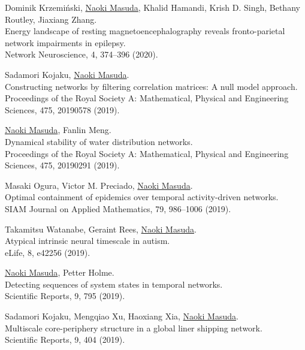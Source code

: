 \documentclass[11pt,letter]{article}
\begin{document}
\begin{etaremune}
\item Dominik Krzemi\'{n}ski, \underline{Naoki Masuda}, Khalid Hamandi, Krish D. Singh, Bethany Routley, Jiaxiang Zhang.\\
Energy landscape of resting magnetoencephalography reveals fronto-parietal network impairments in epilepsy.\\
Network Neuroscience, 4, 374--396 (2020).

\item Sadamori Kojaku, \underline{Naoki Masuda}.\\
Constructing networks by filtering correlation matrices: A null model approach.\\
Proceedings of the Royal Society A: Mathematical, Physical and Engineering Sciences, 475, 20190578 (2019).

\item \underline{Naoki Masuda}, Fanlin Meng.\\
Dynamical stability of water distribution networks.\\
Proceedings of the Royal Society A: Mathematical, Physical and Engineering Sciences, 475, 20190291 (2019).

\item Masaki Ogura, Victor M. Preciado, \underline{Naoki Masuda}.\\
Optimal containment of epidemics over temporal activity-driven networks.\\
SIAM Journal on Applied Mathematics, 79, 986--1006 (2019).

\item Takamitsu Watanabe, Geraint Rees, \underline{Naoki Masuda}.\\
Atypical intrinsic neural timescale in autism.\\
eLife, 8, e42256 (2019).

\item \underline{Naoki Masuda}, Petter Holme.\\
Detecting sequences of system states in temporal networks.\\
Scientific Reports, 9, 795 (2019).

\item Sadamori Kojaku, Mengqiao Xu, Haoxiang Xia, \underline{Naoki Masuda}.\\
Multiscale core-periphery structure in a global liner shipping network.\\
Scientific Reports, 9, 404 (2019).


\end{etaremune}
\end{document}
